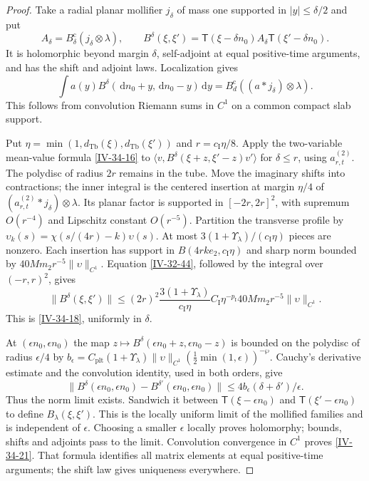 \documentclass[11pt,letterpaper,reqno]{amsart}
\theoremstyle{definition}
\theoremstyle{remark}
\begin{document}
\begin{proof}
Take a radial planar mollifier $j_\delta$ of mass one
supported in $|y|\le\delta/2$ and put
\[
 A_\delta=B_\delta^{\mathrm c}(j_\delta\otimes\lambda),\qquad
 B^\delta(\xi,\xi')=
   \mathsf T(\xi-\delta n_0)A_\delta
                                  \mathsf T(\xi'-\delta n_0).
\]
It is holomorphic beyond margin $\delta$, self-adjoint
at equal positive-time arguments, and has the shift and
adjoint laws. Localization gives
\[
 \int a(y)B^\delta(\,\mathrm{d}n_0+y,\,\mathrm{d}n_0-y)\,\mathrm{d}y
                         =B_d^{\mathrm c}((a*j_\delta)\otimes\lambda).
\]
This follows from convolution Riemann sums in $C^1$ on
a common compact slab support.

Put $\eta=\min(1,d_{\mathrm{Tb}}(\xi),d_{\mathrm{Tb}}(\xi'))$
and $r=c_{\mathrm I}\eta/8$. Apply the two-variable
mean-value formula \eqref{IV-34-16} to
$\langle v,B^\delta(\xi+z,\xi'-z)v'\rangle$ for
$\delta\le r$, using $a^{(2)}_{r,t}$.
The polydisc of radius $2r$ remains in the tube.
Move the imaginary shifts into contractions; the
inner integral is the centered insertion at margin
$\eta/4$ of
$(a^{(2)}_{r,t}*j_\delta)\otimes\lambda$.
Its planar factor is supported in $[-2r,2r]^2$, with
supremum $O(r^{-4})$ and Lipschitz constant $O(r^{-5})$.
Partition the transverse profile by
$\upsilon_k(s)=\chi(s/(4r)-k)\upsilon(s)$.
At most $3(1+\Upsilon_\lambda)/(c_{\mathrm I}\eta)$
pieces are nonzero. Each insertion has support in
$B(4rke_2,c_{\mathrm I}\eta)$ and sharp norm bounded
by $40Mm_2r^{-5}\|\upsilon\|_{C^1}$.
Equation \eqref{IV-32-44}, followed by the integral over
$(-r,r)^2$, gives
\[
 \|B^\delta(\xi,\xi')\|\le
 (2r)^2\frac{3(1+\Upsilon_\lambda)}{c_{\mathrm I}\eta}
 C_{\mathrm I}\eta^{-p_{\mathrm I}}
                           40Mm_2r^{-5}\|\upsilon\|_{C^1}.
\]
This is \eqref{IV-34-18}, uniformly in $\delta$.

At $(\epsilon n_0,\epsilon n_0)$ the map
$z\mapsto B^\delta(\epsilon n_0+z,\epsilon n_0-z)$ is
bounded on the polydisc of radius $\epsilon/4$ by
$b_\epsilon=C_{\mathrm{plt}}(1+\Upsilon_\lambda)
\|\upsilon\|_{C^1}(\frac12\min(1,\epsilon))^{-\wp}$.
Cauchy's derivative estimate and the convolution
identity, used in both orders, give
\[
 \|B^\delta(\epsilon n_0,\epsilon n_0)
       -B^{\delta'}(\epsilon n_0,\epsilon n_0)\|
                 \le4b_\epsilon(\delta+\delta')/\epsilon.
\]
Thus the norm limit exists. Sandwich it between
$\mathsf T(\xi-\epsilon n_0)$ and
$\mathsf T(\xi'-\epsilon n_0)$ to define
$B_\lambda(\xi,\xi')$. This is the locally uniform
limit of the mollified families and is independent of
$\epsilon$. Choosing a smaller $\epsilon$ locally
proves holomorphy; bounds, shifts and adjoints pass to
the limit. Convolution convergence in $C^1$ proves
\eqref{IV-34-21}. That formula identifies all
matrix elements at equal positive-time arguments;
the shift law gives uniqueness everywhere.
\end{proof}
\end{document}

